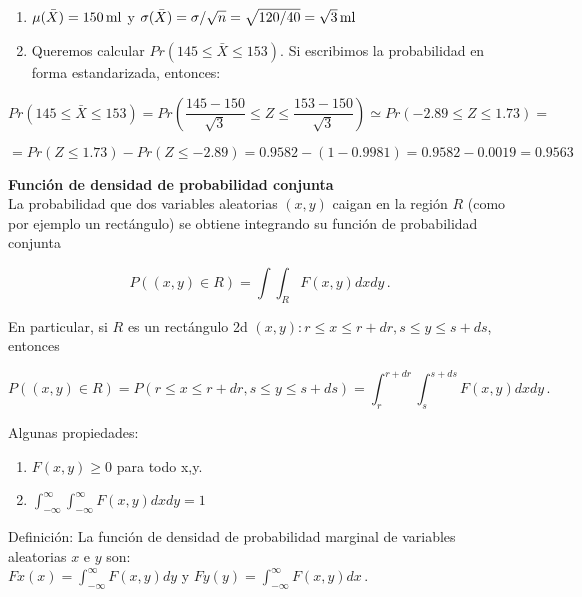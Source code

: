 \documentclass[
]{agujournal2019}
\providecommand{\tightlist}{%
  \setlength{\itemsep}{0pt}\setlength{\parskip}{0pt}}\usepackage{longtable,booktabs,array}
\begin{document}
\begin{enumerate}
\def\labelenumi{(\alph{enumi})}
\tightlist
\item
  \(\mu(\bar{X})=150\,{\rm ml}\) y
  \(\sigma(\bar{X})=\sigma/\sqrt{n}=\sqrt{120/40}= \sqrt{3}\,{\rm ml}\)\\
\item
  Queremos calcular \(Pr(145 \le \bar{X} \le 153)\). Si escribimos la
  probabilidad en forma estandarizada, entonces:
\end{enumerate}

\[Pr(145 \le \bar{X} \le 153) =
      Pr\left( \frac{145-150}{\sqrt{3}} \le Z \le \frac{153-150}{\sqrt{3}}\right)
       \simeq Pr(-2.89 \le Z \le 1.73)=\]

\[=Pr(Z \le 1.73)- Pr(Z \le -2.89)=0.9582-(1-0.9981)=0.9582-0.0019=0.9563\]

\vspace{0.5cm}

\textbf{Función de densidad de probabilidad conjunta}\\

La probabilidad que dos variables aleatorias \((x,y)\) caigan en la
región \(R\) (como por ejemplo un rectángulo) se obtiene integrando su
función de probabilidad conjunta

\[P((x,y)\in R)=\int\int_{R} F(x,y) dx dy\,.\]

En particular, si \(R\) es un rectángulo 2d
\({(x,y):r\le x \le r+dr, s \le y \le s+ds}\), entonces

\[P((x,y)\in R)=P(r\le x \le r+dr, s \le y \le s+ds)=\int^{r+dr}_r\int^{s+ds}_{s} F(x,y) dx dy\,.\]

Algunas propiedades:\\

\begin{enumerate}
\def\labelenumi{(\arabic{enumi})}
\tightlist
\item
  \(F(x,y)\ge0\) para todo x,y.\\
\item
  \(\int^{\infty}_{-\infty}\int^{\infty}_{-\infty} F(x,y) dx dy=1\)\\
\end{enumerate}

Definición: La función de densidad de probabilidad marginal de variables
aleatorias \(x\) e \(y\) son:\\
\(Fx(x)=\int^{\infty}_{-\infty} F(x,y)dy\) y
\(Fy(y)=\int^{\infty}_{-\infty} F(x,y)dx\,.\)

\vspace{0.5cm}
\end{document}

